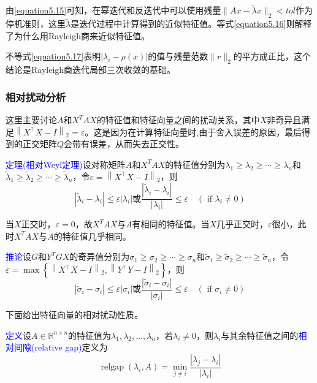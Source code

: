 \documentclass[12pt,a4paper]{article}
\begin{document}
由\ref{equation5.15}可知，在幂迭代和反迭代中可以使用残量$\|A x-\tilde{\lambda} x\|_{2}<t o l$作为停机准则，这里$\tilde{\lambda}$是迭代过程中计算得到的近似特征值。等式\ref{equation5.16}则解释了为什么用Rayleigh商来近似特征值。

不等式\ref{equation5.17}表明$\left|\lambda_{i}-\rho(x)\right|$的值与残量范数$\|r\|_{2}$的平方成正比，这个结论是Rayleigh商迭代局部三次收敛的基础。
\subsubsection{相对扰动分析}
这里主要讨论$A$和$X^TAX$的特征值和特征向量之间的扰动关系，其中$X$非奇异且满足$\left\|X^{\top} X-I\right\|_{2}=\varepsilon$。这是因为在计算特征向量时,由于舍入误差的原因，最后得到的正交矩阵$Q$会带有误差，从而失去正交性。

\textcolor{blue}{定理(相对Weyl定理)}\quad 设对称矩阵$A$和$X^TAX$的特征值分别为$\lambda_{1} \geq \lambda_{2} \geq \cdots \geq \lambda_{n}$和$\tilde{\lambda}_{1} \geq \tilde{\lambda}_{2} \geq \cdots \geq \tilde{\lambda}_{n}$，令$\varepsilon=\left\|X^{\top} X-I\right\|_{2}$，则$$
\left|\tilde{\lambda}_{i}-\lambda_{i}\right| \leq \varepsilon\left|\lambda_{i}\right|
\text{或}\frac{\left|\tilde{\lambda}_{i}-\lambda_{i}\right|}{\left|\lambda_{i}\right|} \leq \varepsilon \quad\left(\text { if } \lambda_{i} \neq 0\right)$$

当$X$正交时，$\varepsilon=0$，故$X^TAX$与$A$有相同的特征值。当$X$几乎正交时，$\varepsilon$很小，此时$X^TAX$与$A$的特征值几乎相同。

\textcolor{blue}{推论}\quad 设$G$和$Y^TGX$的奇异值分别为$\sigma_{1} \geq \sigma_{2} \geq \cdots \geq \sigma_{n}$和$\tilde{\sigma}_{1} \geq \tilde{\sigma}_{2} \geq \cdots \geq \tilde{\sigma}_{n}$，令$\varepsilon=\max \left\{\left\|X^{\top} X-I\right\|_{2},\left\|Y^{\top} Y-I\right\|_{2}\right\}$，则$$
\left|\tilde{\sigma}_{i}-\sigma_{i}\right| \leq \varepsilon\left|\sigma_{i}\right|
\text{或}\frac{\left|\tilde{\sigma}_{i}-\sigma_{i}\right|}{\left|\sigma_{i}\right|} \leq \varepsilon \quad\left(\text { if } \sigma_{i} \neq 0\right)
$$

下面给出特征向量的相对扰动性质。

\textcolor{blue}{定义}\quad 设$A \in \mathbb{R}^{n \times n}$的特征值为$\lambda_{1}, \lambda_{2}, \ldots, \lambda_{n}$，若$\lambda_{i}\neq 0$，则$\lambda_{i}$与其余特征值之间的\textcolor{blue}{相对间隙(relative gap)}定义为$$
\operatorname{relgap}\left(\lambda_{i}, A\right)=\min _{j \neq i} \frac{\left|\lambda_{j}-\lambda_{i}\right|}{\left|\lambda_{i}\right|}
$$
\end{document}
